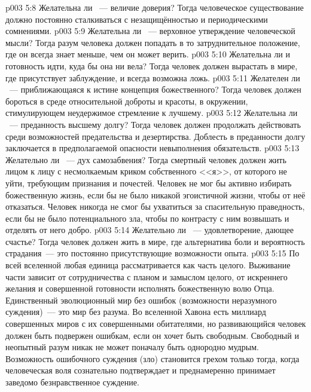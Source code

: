 \vs p003 5:8 Желательна ли ~--- величие доверия? Тогда человеческое существование должно постоянно сталкиваться с незащищённостью и периодическими сомнениями.
\vs p003 5:9 Желательна ли ~--- верховное утверждение человеческой мысли? Тогда разум человека должен попадать в то затруднительное положение, где он всегда знает меньше, чем он может верить.
\vs p003 5:10 Желательна ли  и готовность идти, куда бы она ни вела? Тогда человек должен вырастать в мире, где присутствует заблуждение, и всегда возможна ложь.
\vs p003 5:11 Желателен ли ~--- приближающаяся к истине концепция божественного? Тогда человек должен бороться в среде относительной доброты и красоты, в окружении, стимулирующем неудержимое стремление к лучшему.
\vs p003 5:12 Желательна ли ~--- преданность высшему долгу? Тогда человек должен продолжать действовать среди возможностей предательства и дезертирства. Доблесть в преданности долгу заключается в предполагаемой опасности невыполнения обязательств.
\vs p003 5:13 Желательно ли ~--- дух самозабвения? Тогда смертный человек должен жить лицом к лицу с несмолкаемым криком собственного <<я>>, от которого не уйти, требующим признания и почестей. Человек не мог бы активно избирать божественную жизнь, если бы не было никакой эгоистичной жизни, чтобы от неё отказаться. Человек никогда не смог бы ухватиться за спасительную праведность, если бы не было потенциального зла, чтобы по контрасту с ним возвышать и отделять от него добро.
\vs p003 5:14 Желательно ли ~--- удовлетворение, дающее счастье? Тогда человек должен жить в мире, где альтернатива боли и вероятность страдания~--- это постоянно присутствующие возможности опыта.
\vs p003 5:15 \pc По всей вселенной любая единица рассматривается как часть целого. Выживание части зависит от сотрудничества с планом и замыслом целого, от искреннего желания и совершенной готовности исполнять божественную волю Отца. Единственный эволюционный мир без ошибок (возможности неразумного суждения)~--- это мир без  разума. Во вселенной Хавона есть миллиард совершенных миров с их совершенными обитателями, но развивающийся человек должен быть подвержен ошибкам, если он хочет быть свободным. Свободный и неопытный разум никак не может поначалу быть однородно мудрым. Возможность ошибочного суждения (зло) становится грехом только тогда, когда человеческая воля сознательно подтверждает и преднамеренно принимает заведомо безнравственное суждение.
